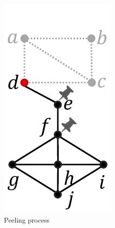 \documentclass[sigconf]{acmart}
\begin{document}
\begin{figure}[h]
\begin{subfigure}{.32\linewidth}
\includegraphics[width=0.7\linewidth]{figures/algorithm_2.pdf}
\vspace{-0.2cm}
\caption{Peeling process}
\label{fig:alg2}
\end{subfigure}
\begin{subfigure}{.32\linewidth}
\centering

\end{subfigure}
\end{figure}
\end{document}
